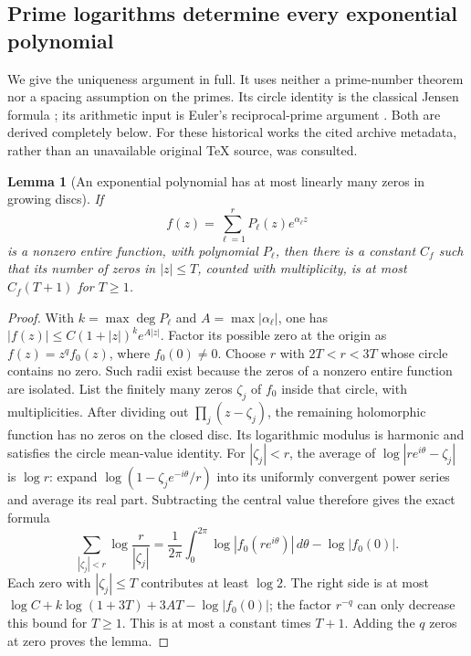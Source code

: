 \documentclass[11pt,a4paper]{article}
\newtheorem{lemma}[theorem]{Lemma}
\theoremstyle{definition}\newtheorem{definition}[theorem]{Definition}
\begin{document}
\subsection{Prime logarithms determine every exponential polynomial}

We give the uniqueness argument in full. It uses neither a
prime-number theorem nor a spacing assumption on the primes.
Its circle identity is the classical Jensen formula
\cite{PO:Jensen}; its arithmetic input is Euler's reciprocal-prime
argument \cite{PO:Euler}. Both are derived completely below.
For these historical works the cited archive metadata, rather
than an unavailable original TeX source, was consulted.

\begin{lemma}[An exponential polynomial has at most linearly many
zeros in growing discs]\label{PO:lem:zero-count}
If
\[
 f(z)=\sum_{\ell=1}^r P_\ell(z)e^{\alpha_\ell z}
 \tag{PO23}\label{PO:po:exp-polynomial}
\]
is a nonzero entire function, with polynomial \(P_\ell\), then
there is a constant \(C_f\) such that its number of zeros in
\(|z|\le T\), counted with multiplicity, is at most
\(C_f(T+1)\) for \(T\ge1\).
\end{lemma}
\begin{proof}
With \(k=\max\deg P_\ell\) and \(A=\max|\alpha_\ell|\), one has
\(|f(z)|\le C(1+|z|)^k e^{A|z|}\).
Factor its possible zero at the origin as \(f(z)=z^q f_0(z)\),
where \(f_0(0)\ne0\).
Choose \(r\) with \(2T<r<3T\) whose circle contains no zero.
Such radii exist because the zeros of a nonzero entire function
are isolated. List the finitely many zeros \(\zeta_j\) of \(f_0\)
inside that circle, with multiplicities. After dividing out
\(\prod_j(z-\zeta_j)\), the remaining holomorphic function has
no zeros on the closed disc. Its logarithmic modulus is harmonic
and satisfies the circle mean-value identity. For \(|\zeta_j|<r\),
the average of \(\log|re^{i\theta}-\zeta_j|\) is \(\log r\):
expand \(\log(1-\zeta_je^{-i\theta}/r)\) into its uniformly
convergent power series and average its real part.
Subtracting the central value therefore gives the exact formula
\[
 \sum_{|\zeta_j|<r}\log\frac r{|\zeta_j|}
  =\frac1{2\pi}\int_0^{2\pi}
       \log|f_0(re^{i\theta})|\,d\theta-\log|f_0(0)|.
 \tag{PO24}\label{PO:po:circle-count}
\]
Each zero with \(|\zeta_j|\le T\) contributes at least \(\log2\).
The right side is at most
\(\log C+k\log(1+3T)+3AT-\log|f_0(0)|\);
the factor \(r^{-q}\) can only decrease this bound for \(T\ge1\).
This is at most a constant times \(T+1\).
Adding the \(q\) zeros at zero proves the lemma.
\end{proof}
\end{document}
